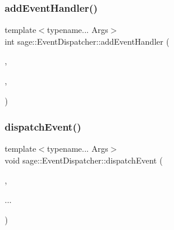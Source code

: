 \mbox{\label{classsage_1_1EventDispatcher_a730d8eaf8806453d30dede2150b60071}} 
\subsubsection{\texorpdfstring{addEventHandler()}{addEventHandler()}\hspace{0.1cm}{\footnotesize\ttfamily [2/2]}}
{\footnotesize\ttfamily template$<$typename... Args$>$ \\
int sage\+::\+Event\+Dispatcher\+::add\+Event\+Handler (\begin{DoxyParamCaption}\item[{\mbox{\hyperlink{namespacesage_ad2c7b0e1ebf67f572d43620e6b07aa13}{Node\+Event}}}]{,  }\item[{\mbox{\hyperlink{classsage_1_1Node}{Node}} \&}]{,  }\item[{std\+::function$<$ void(Args...)$>$ \&\&}]{ }\end{DoxyParamCaption})}

\mbox{\label{classsage_1_1EventDispatcher_a096c6d68c684bb49ec1f8055c0e2a2d9}} 
\subsubsection{\texorpdfstring{dispatchEvent()}{dispatchEvent()}\hspace{0.1cm}{\footnotesize\ttfamily [1/2]}}
{\footnotesize\ttfamily template$<$typename... Args$>$ \\
void sage\+::\+Event\+Dispatcher\+::dispatch\+Event (\begin{DoxyParamCaption}\item[{\mbox{\hyperlink{namespacesage_afe706a25026cc74fe69b56d53a265d29}{Event}}}]{,  }\item[{Args \&\&}]{... }\end{DoxyParamCaption})}

\mbox{\label{classsage_1_1EventDispatcher_a80201aec738c2f1aaa5b812f867f28fd}} 
